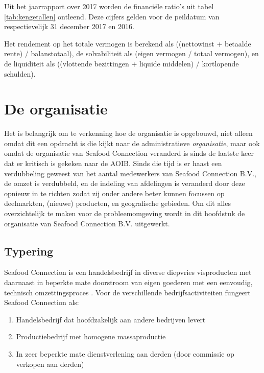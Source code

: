 Uit het jaarrapport over 2017 worden de financiële ratio’s uit tabel \ref{tab:kengetallen} ontleend. Deze cijfers gelden voor de peildatum van respectievelijk 31 december 2017 en 2016.

Het rendement op het totale vermogen is berekend als ((nettowinst + betaalde rente) / balanstotaal), de solvabiliteit als (eigen vermogen / totaal vermogen), en de liquiditeit als ((vlottende bezittingen + liquide middelen) / kortlopende schulden). \citep{jaarrapport2017}

\newpage
    \section{De organisatie}
Het is belangrijk om te verkenning hoe de organisatie is opgebouwd, niet alleen omdat dit een opdracht is die kijkt naar de administratieve \textit{organisatie}, maar ook omdat de organisatie van Seafood Connection veranderd is sinds de laatste keer dat er kritisch is gekeken naar de AOIB. Sinds die tijd is er haast een verdubbeling geweest van het aantal medewerkers van Seafood Connection B.V., de omzet is verdubbeld, en de indeling van afdelingen is veranderd door deze opnieuw in te richten zodat zij onder andere beter kunnen focussen op deelmarkten, (nieuwe) producten, en geografische gebieden. Om dit alles overzichtelijk te maken voor de probleemomgeving wordt in dit hoofdstuk de organisatie van Seafood Connection B.V. uitgewerkt. 

\subsection{Typering}
Seafood Connection is een handelsbedrijf in diverse diepvries visproducten met daarnaast in beperkte mate doorstroom van eigen goederen met een eenvoudig, technisch omzettingsproces \citep{aoibsfc}. Voor de verschillende bedrijfsactiviteiten fungeert Seafood Connection als:

\begin{enumerate}
    \item Handelsbedrijf dat hoofdzakelijk aan andere bedrijven levert
    \item Productiebedrijf met homogene massaproductie
    \item In zeer beperkte mate dienstverlening aan derden (door commissie op verkopen aan derden)
\end{enumerate}

